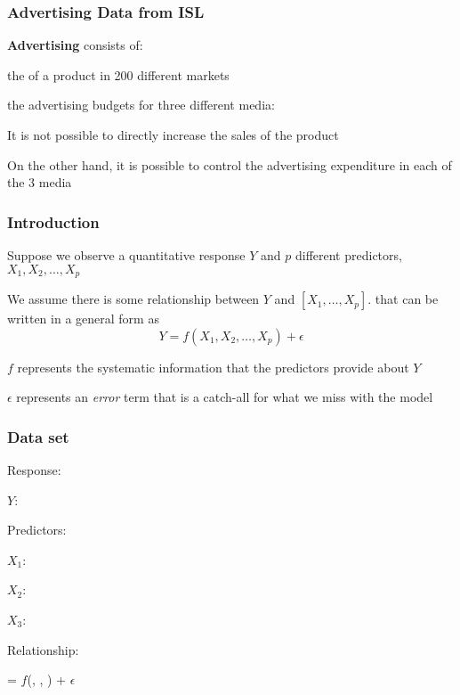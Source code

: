 \documentclass[12pt]{beamer}\usepackage[]{graphicx}\usepackage[]{color}
\begin{document}
\begin{frame}
\frametitle{Advertising Data from ISL}

\textbf{Advertising} consists of:

\bi
  \item the  of a product in 200 different markets
  \item the advertising budgets for three different media:
  \bi
    \item {}
    \item {}
    \item {}
  \ei
  \item It is not possible to directly increase the sales of the product
  \item On the other hand, it is possible to control the advertising expenditure 
  in each of the 3 media
\ei

\end{frame}


\begin{frame}
\frametitle{Introduction}

\bbi
  \item Suppose we observe a quantitative response $Y$ and $p$ 
  different predictors, $X_1, X_2, \dots, X_p$
  \item We assume there is some relationship between $Y$ and $[X_1, \dots, X_p]$.
  that can be written in a general form as
  $$
  Y = f(X_1, X_2, \dots, X_p) + \epsilon
  $$
  \item $f$ represents the systematic information that the predictors provide about $Y$
  \item $\epsilon$ represents an \textit{error} term that is a catch-all for what we miss with the model
\ei

\end{frame}


\begin{frame}[fragile]
\frametitle{Data set }

Response:
\bi
  \item  $Y$: 
\ei 

Predictors:
\bi
  \item $X_1$: 
  \item $X_2$: 
  \item $X_3$: 
\ei

\bigskip
Relationship:
\begin{center}
 = $f$(, , ) + $\epsilon$
\end{center}

\end{frame}
\end{document}
